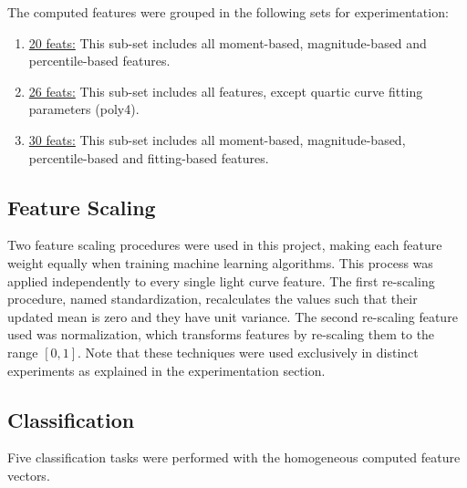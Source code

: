 The computed features were grouped in the following sets for experimentation:

\begin{enumerate}
    \item \underline{20 feats:} This sub-set includes all moment-based, magnitude-based and percentile-based features.
    \item \underline{26 feats:} This sub-set includes all features, except quartic curve fitting parameters (poly4).
    \item \underline{30 feats:} This sub-set includes all moment-based, magnitude-based, percentile-based and fitting-based features.
\end{enumerate}


\subsection{Feature Scaling}
Two feature scaling procedures were used in this project, making each feature weight equally when training machine learning algorithms. This process was applied independently to every single light curve feature. The first re-scaling procedure, named standardization, recalculates the values such that their updated mean is zero and they have unit variance. The second re-scaling feature used was normalization, which transforms features by re-scaling them to the range $[0,1]$. Note that these techniques were used exclusively in distinct experiments as explained in the experimentation section.

\subsection{Classification}

Five classification tasks were performed with the homogeneous computed feature vectors.

